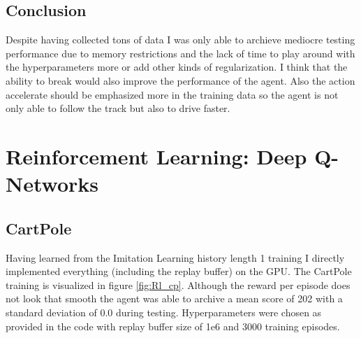 \documentclass[10pt]{scrartcl}
\begin{document}
\subsection*{Conclusion}
Despite having collected tons of data I was only able to archieve mediocre testing performance due to memory restrictions and the lack of time to play around with the hyperparameters more or add other kinds of regularization. I think that the ability to break would also improve the performance of the agent. Also the action \dq accelerate\dq{} should be emphasized more in the training data so the agent is not only able to follow the track but also to drive faster.

\section{Reinforcement Learning: Deep Q-Networks}
\subsection{CartPole}
Having learned from the Imitation Learning history length 1 training I directly implemented everything (including the replay buffer) on the GPU. The CartPole training is visualized in figure \ref{fig:Rl_cp}. Although the reward per episode does not look that smooth the agent was able to archive a mean score of 202 with a standard deviation of 0.0 during testing. Hyperparameters were chosen as provided in the code with replay buffer size of 1e6 and 3000 training episodes.
\end{document}
